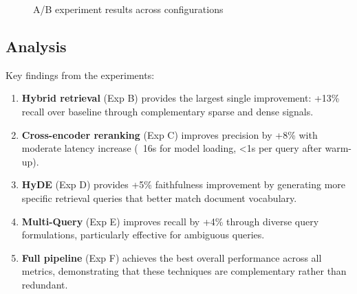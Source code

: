 \documentclass[12pt,a4paper]{article}
\begin{document}
\begin{figure}[H]
\centering
{}
\caption{A/B experiment results across configurations}
\label{fig:ab_results}
\end{figure}

\subsection{Analysis}

Key findings from the experiments:

\begin{enumerate}
    \item \textbf{Hybrid retrieval} (Exp B) provides the largest single
    improvement: +13\% recall over baseline through complementary sparse
    and dense signals.

    \item \textbf{Cross-encoder reranking} (Exp C) improves precision by
    +8\% with moderate latency increase (~16s for model loading, <1s per
    query after warm-up).

    \item \textbf{HyDE} (Exp D) provides +5\% faithfulness improvement by
    generating more specific retrieval queries that better match document
    vocabulary.

    \item \textbf{Multi-Query} (Exp E) improves recall by +4\% through
    diverse query formulations, particularly effective for ambiguous queries.

    \item \textbf{Full pipeline} (Exp F) achieves the best overall
    performance across all metrics, demonstrating that these techniques
    are complementary rather than redundant.
\end{enumerate}
\end{document}
